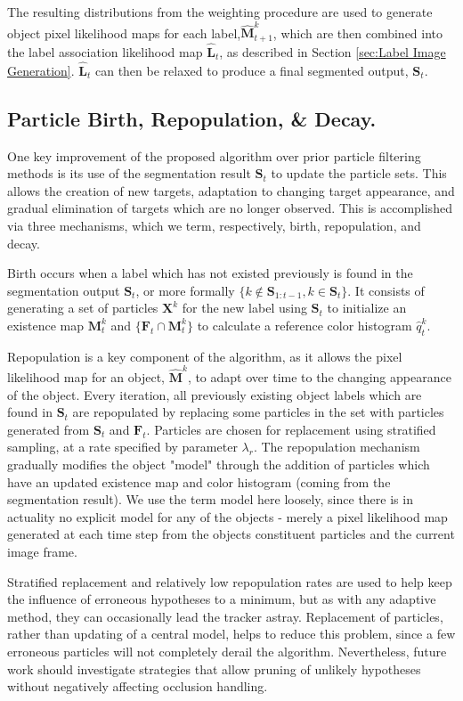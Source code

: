 The resulting distributions from the weighting procedure are used to generate object pixel likelihood maps for each label,$\mathbf{\hat{M}}^{k}_{t+1}$, which are then combined into the label association likelihood map $\mathbf{\hat{L}}_t$, as described in Section \ref{sec:Label Image Generation}. $\mathbf{\hat{L}}_t$ can then be relaxed to produce a final segmented output, $\mathbf{S}_t$. 

\subsection{Particle Birth, Repopulation, \& Decay.}
One key improvement of the proposed algorithm over prior particle filtering methods is its use of the segmentation result $\mathbf{S}_{t}$ to update the particle sets. This allows the creation of new targets, adaptation to changing target appearance, and gradual elimination of targets which are no longer observed. This is accomplished via three mechanisms, which we term, respectively, birth, repopulation, and decay. 

Birth occurs when a label which has not existed previously is found in the segmentation output $\mathbf{S}_{t}$, or more formally $ \{ k\notin \mathbf{S}_{1:t-1}, k\in \mathbf{S}_{t}\}$. It consists of generating a set of particles $\mathbf{X}^k$ for the new label using $\mathbf{S}_{t}$ to initialize an existence map $\mathbf{M}^k_t$ and $\{\mathbf{F}_{t} \cap \mathbf{M}^k_t \}$ to calculate a reference color histogram $\mathit{\hat{q}^k_t}$.

Repopulation is a key component of the algorithm, as it allows the pixel likelihood map for an object, $\mathbf{\hat{M}}^k$, to adapt over time to the changing appearance of the object. Every iteration, all previously existing object labels which are found in $\mathbf{S}_{t}$ are repopulated by replacing some particles in the set with particles generated from $\mathbf{S}_{t}$ and $\mathbf{F}_{t}$. Particles are chosen for replacement using stratified sampling, at a rate specified by parameter $\lambda_r$. The repopulation mechanism gradually modifies the object "model" through the addition of particles which have an updated existence map and color histogram (coming from the segmentation result). We use the term model here loosely, since there is in actuality no explicit model for any of the objects - merely a pixel likelihood map generated at each time step from the objects constituent particles and the current image frame. 

Stratified replacement and relatively low repopulation rates are used to help keep the influence of erroneous hypotheses to a minimum, but as with any adaptive method, they can occasionally lead the tracker astray. Replacement of particles, rather than updating of a central model, helps to reduce this problem, since a few erroneous particles will not completely derail the algorithm. Nevertheless, future work should investigate strategies that allow pruning of unlikely hypotheses without negatively affecting occlusion handling. 

